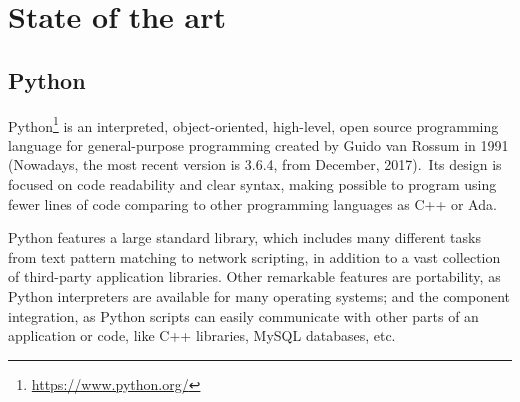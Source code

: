 \documentclass[a4paper, 12pt]{book}
\begin{document}
\chapter{State of the art}
\section{Python}
\label{sec:python}
Python\footnote{\url{https://www.python.org/}} is an interpreted, object-oriented, high-level, open source
programming language for general-purpose programming created by Guido van Rossum in 1991 (Nowadays, the most
recent version is 3.6.4, from December, 2017).\ Its design is focused on code readability and clear syntax, making
possible to program using fewer lines of code comparing to other programming languages as C++ or Ada.\

Python features a large standard library, which includes many different tasks from text pattern matching to network
scripting, in addition to a vast collection of third-party application libraries.
Other remarkable features are portability, as Python interpreters are available for many operating systems;
and the component integration, as Python scripts can easily communicate with other parts of an application or code,
like C++ libraries, MySQL databases, etc.\\
\end{document}

